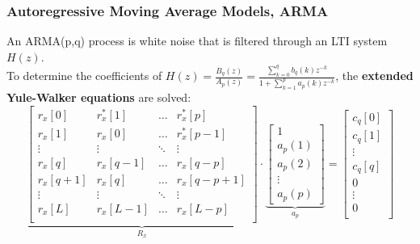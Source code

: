 \subsubsection{Autoregressive Moving Average Models, ARMA }
An ARMA(p,q) process is white noise that is filtered through an LTI system $H(z)$.\\
To determine the coefficients of $H(z)=\frac{B_q(z)}{A_p(z)}=\frac{\sum\limits_{k=0}^q b_q(k)z^{-k}}{1+\sum\limits_{k=1}^p a_p(k)z^{-k}}$, the \textbf{extended Yule-Walker equations} are solved:
\small$$
\underbrace{\begin{bmatrix}
			r_x[0] & r_x^*[1] & \hdots & r_x^*[p] \\
			r_x[1] & r_x[0] & \hdots & r_x^*[p-1] \\
			\vdots & \vdots & \ddots & \vdots \\
			r_x[q] & r_x[q-1] & \hdots & r_x[q-p] \\
			r_x[q+1] & r_x[q] & \hdots & r_x[q-p+1] \\
			\vdots & \vdots & \ddots & \vdots \\
			r_x[L] & r_x[L-1] & \hdots & r_x[L-p] \\
		\end{bmatrix}  }_{R_x} \cdot \underbrace{\begin{bmatrix}
			1\\
			a_p(1) \\
			a_p(2) \\
			\vdots \\
			a_p(p)
		\end{bmatrix}  }_{a_p}= \begin{bmatrix}
				c_q[0]\\
				c_q[1]\\
			\vdots \\
				c_q[q]\\
				0\\
			\vdots \\
				0\\
		\end{bmatrix}
			$$ \normalsize


